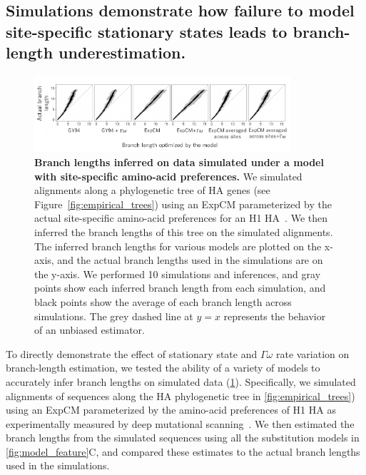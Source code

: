 \documentclass[11pt]{article}
\begin{document}
\subsection*{Simulations demonstrate how failure to model site-specific stationary states leads to branch-length underestimation.}

\begin{figure}
\centerline{\includegraphics[width=0.85\textwidth]{figures/simulations}}
\caption{\label{fig:simulations}
\textbf{Branch lengths inferred on data simulated under a model with site-specific amino-acid preferences.} 
We simulated alignments along a phylogenetic tree of HA genes (see Figure~\ref{fig:empirical_trees}) using an ExpCM parameterized by the actual site-specific amino-acid preferences for an H1 HA~\citep{doud2016accurate}.
We then inferred the branch lengths of this tree on the simulated alignments.
The inferred branch lengths for various models are plotted on the x-axis, and the actual branch lengths used in the simulations are on the y-axis.
We performed 10 simulations and inferences, and gray points show each inferred branch length from each simulation, and black points show the average of each branch length across simulations.
The grey dashed line at $y=x$ represents the behavior of an unbiased estimator. 
}
\end{figure}

To directly demonstrate the effect of stationary state and $\Gamma\omega$ rate variation on branch-length estimation, we tested the ability of a variety of models to accurately infer branch lengths on simulated data (\ref{fig:simulations}).
Specifically, we simulated alignments of sequences along the HA phylogenetic tree in \ref{fig:empirical_trees}) using an ExpCM parameterized by the amino-acid preferences of H1 HA as experimentally measured by deep mutational scanning~\citep{doud2016accurate}. We then estimated the branch lengths from the simulated sequences using all the substitution models in \ref{fig:model_feature}C, and compared these estimates to the actual branch lengths used in the simulations.
\end{document}
